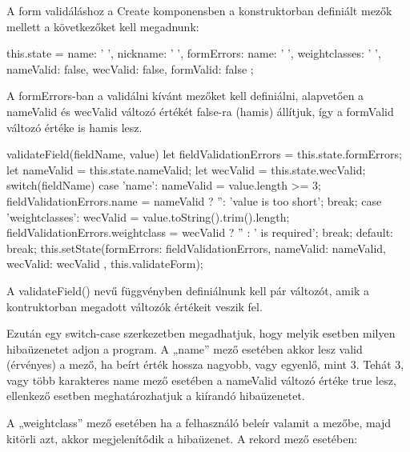 
A form validáláshoz a Create komponensben a konstruktorban definiált mezők mellett a következőket kell megadnunk:

\begin{cpp}
this.state = {
      name: ' ',
      nickname: ' ',
      formErrors: {name: ' ', weightclasses: ' '},
      nameValid: false,
      wecValid: false,
      formValid: false
};
\end{cpp}

A formErrors-ban a validálni kívánt mezőket kell definiálni, alapvetően a nameValid és wecValid változó értékét false-ra (hamis) állítjuk, így a formValid változó értéke is hamis lesz.

\begin{cpp}
validateField(fieldName, value) {
    let fieldValidationErrors = this.state.formErrors;
    let nameValid = this.state.nameValid;
    let wecValid = this.state.wecValid;
    switch(fieldName) {
      case 'name':
        nameValid = value.length >= 3;
        fieldValidationErrors.name = nameValid ? '': 'value is too short';
        break;
      case 'weightclasses':
        wecValid = value.toString().trim().length;
        fieldValidationErrors.weightclass = wecValid ? '' : ' is required';
        break;
      default:
        break; }
    this.setState({formErrors: fieldValidationErrors,
                    nameValid: nameValid,
                    wecValid: wecValid
                  }, this.validateForm);
  }
\end{cpp}

A validateField() nevű függvényben definiálnunk kell pár változót, amik a kontruktorban megadott változók értékeit veszik fel.

Ezután egy switch-case szerkezetben megadhatjuk, hogy melyik esetben milyen hibaüzenetet adjon a program. 
A „name” mező esetében akkor lesz valid (érvényes) a mező, ha beírt érték hossza nagyobb, vagy egyenlő, mint 3. Tehát 3, vagy több karakteres name mező esetében a nameValid változó értéke true lesz, ellenkező esetben meghatározhatjuk a kiírandó hibaüzenetet.

A „weightclass” mező esetében ha a felhasználó beleír valamit a mezőbe, majd kitörli azt, akkor megjelenítődik a hibaüzenet.
A rekord mező esetében:


